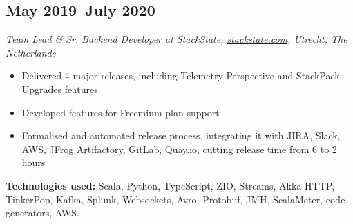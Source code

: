 \subsection*{May 2019--July 2020}

\textit{Team Lead \& Sr. Backend Developer at StackState,
\href{https://stackstate.com}{\url{stackstate.com}}, Utrecht, The
Netherlands}

\begin{itemize}[noitemsep]
  \item Delivered 4 major releases, including Telemetry Perspective and StackPack Upgrades features
  \item Developed features for Freemium plan support
  \item Formalised and automated release process, integrating it with JIRA, Slack, AWS, JFrog Artifactory,
        GitLab, Quay.io, cutting release time from 6 to 2 hours
\end{itemize}

\textbf{Technologies used:}
Scala, Python, TypeScript, ZIO, Streams, Akka HTTP, TinkerPop, Kafka, Splunk,
Websockets, Avro, Protobuf, JMH, ScalaMeter, code generators,
AWS.
